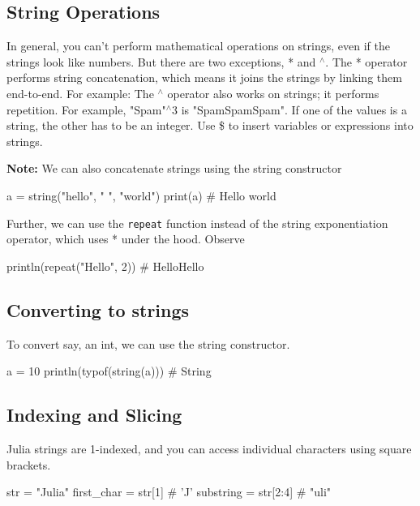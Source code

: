 \documentclass{report}
\begin{document}
    \subsection{String Operations}
    \bigbreak \noindent 
    In general, you can’t perform mathematical operations on strings, even if the strings look like numbers. But there are two exceptions, * and $^{\land}$.
    \bigbreak \noindent 
    The * operator performs string concatenation, which means it joins the strings by linking them end-to-end. For example:
    \bigbreak \noindent 
    The $^{\land} $ operator also works on strings; it performs repetition. For example, "Spam"$^{\land}3$ is "SpamSpamSpam". If one of the values is a string, the other has to be an integer.
    \bigbreak \noindent 
    Use \$ to insert variables or expressions into strings.
    \bigbreak \noindent 
    \bigbreak \noindent 
    \textbf{Note:} We can also concatenate strings using the string constructor
    \bigbreak \noindent 
    \begin{jlcode}
    a = string("hello", " ", "world")
    print(a) # Hello world
    \end{jlcode}
    \bigbreak \noindent 
    Further, we can use the \texttt{repeat} function instead of the string exponentiation operator, which uses * under the hood. Observe
    \bigbreak \noindent 
    \begin{jlcode}
    println(repeat("Hello", 2)) #  HelloHello
    \end{jlcode}

    \bigbreak \noindent 
    \subsection{Converting to strings}
    \bigbreak \noindent 
    To convert say, an int, we can use the string constructor.
    \bigbreak \noindent 
    \begin{jlcode}
    a = 10 
    println(typof(string(a))) # String
    \end{jlcode}



    \bigbreak \noindent 
    \subsection{Indexing and Slicing}
    \bigbreak \noindent 
    Julia strings are 1-indexed, and you can access individual characters using square brackets.
    \bigbreak \noindent 
    \begin{jlcode}
        str = "Julia"
        first_char = str[1]  # 'J'
        substring = str[2:4]  # "uli"
    \end{jlcode}
\end{document}
